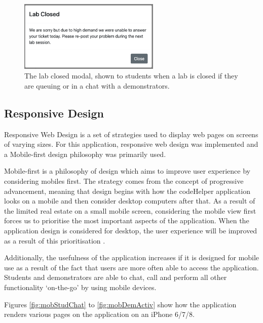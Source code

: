 \begin{figure}[H]
    \centering
    \includegraphics[width=0.6\textwidth]{7design/images/labClosedModal.png}
    \caption{The lab closed modal, shown to students when a lab is closed if they are queuing or in a chat with a demonstrators.}
    \label{fig:labclosedmodal}
\end{figure}

\subsection{Responsive Design}

Responsive Web Design is a set of strategies used to display web pages on screens of varying sizes. For this application, responsive web design was implemented and a Mobile-first design philosophy was primarily used.

Mobile-first is a philosophy of design which aims to improve user experience by considering mobiles first. The strategy comes from the concept of progressive advancement, meaning that design begins with how the codeHelper application looks on a mobile and then consider desktop computers after that. As a result of the limited real estate on a small mobile screen, considering the mobile view first forces us to prioritise the most important aspects of the application. When the application design is considered for desktop, the user experience will be improved as a result of this prioritisation \cite{mobilefirst}. 

Additionally, the usefulness of the application increases if it is designed for mobile use as a result of the fact that users are more often able to access the application. Students and demonstrators are able to chat, call and perform all other functionality `on-the-go' by using mobile devices.

Figures \ref{fig:mobStudChat} to \ref{fig:mobDemActiv} show how the application renders various pages on the application on an iPhone 6/7/8.

